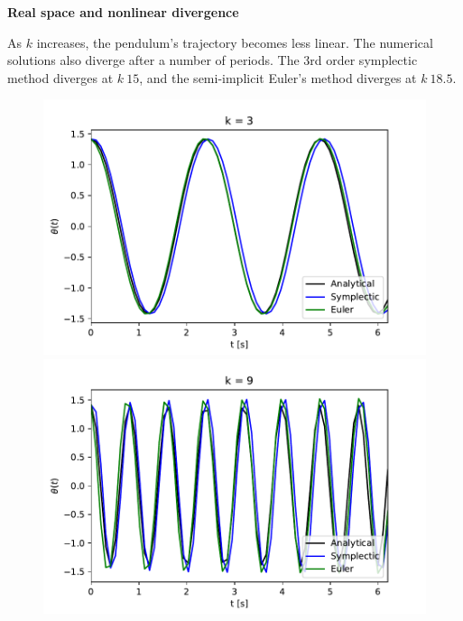 \begin{problem}{1}
	\textbf{Real space and nonlinear divergence}

  As $k$ increases, the pendulum's trajectory becomes less linear. The numerical
  solutions also diverge after a number of periods. The 3rd order symplectic
  method diverges at $k ~ 15$, and the semi-implicit Euler's method diverges at
  $k ~ 18.5$.

\noindent
\begin{figure}[ht!]
	\centering
	\begin{minipage}[b]{0.4\textwidth}
	  \includegraphics[scale=0.6]{../figures/k3_nonlin.pdf}
	\end{minipage}
	\hfill
	\begin{minipage}[b]{0.4\textwidth}
	  \includegraphics[scale=0.6]{../figures/k9_nonlin.pdf}
	\end{minipage}
	\begin{minipage}[b]{0.4\textwidth}

\end{minipage}
\end{figure}
\end{problem}
